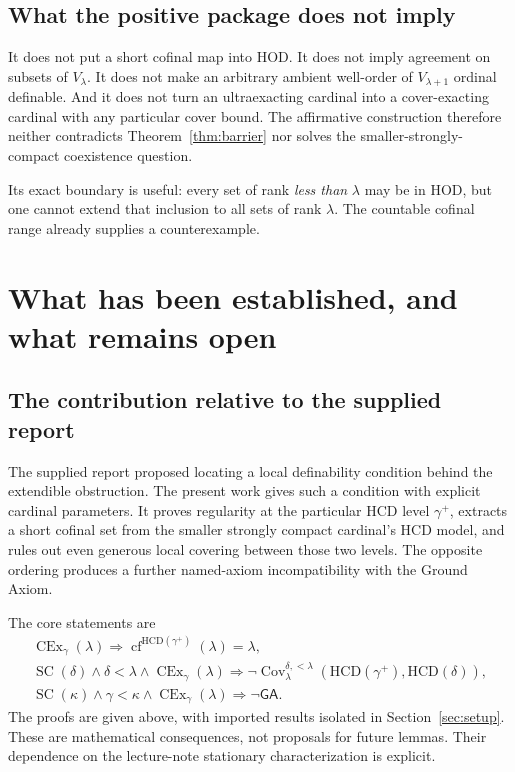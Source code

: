 \documentclass[11pt,letterpaper]{article}
\theoremstyle{definition}
\newcommand{\SC}{\operatorname{SC}}
\newcommand{\CEx}{\operatorname{CEx}}
\newcommand{\cf}{\operatorname{cf}}
\newcommand{\HCD}{\mathrm{HCD}}
\newcommand{\GA}{\mathsf{GA}}
\newcommand{\Cov}{\operatorname{Cov}}
\begin{document}
\subsection{What the positive package does not imply}

It does not put a short cofinal map into HOD. It does not imply agreement on
subsets of $V_\lambda$. It does not make an arbitrary ambient well-order of
$V_{\lambda+1}$ ordinal definable. And it does not turn an ultraexacting
cardinal into a cover-exacting cardinal with any particular cover bound.
The affirmative construction therefore neither contradicts
Theorem~\ref{thm:barrier} nor solves the smaller-strongly-compact coexistence
question.

Its exact boundary is useful: every set of rank \emph{less than} $\lambda$
may be in HOD, but one cannot extend that inclusion to all sets of rank
$\lambda$. The countable cofinal range already supplies a counterexample.

\section{What has been established, and what remains open}\label{sec:status}

\subsection{The contribution relative to the supplied report}

The supplied report proposed locating a local definability condition behind
the extendible obstruction. The present work gives such a condition with
explicit cardinal parameters. It proves regularity at the particular HCD
level $\gamma^+$, extracts a short cofinal set from the smaller strongly compact
cardinal's HCD model, and rules out even generous local covering between those
two levels. The opposite ordering produces a further named-axiom
incompatibility with the Ground Axiom.

The core statements are
\[
 \begin{gathered}
 \CEx_\gamma(\lambda)\Rightarrow
       \cf^{\HCD(\gamma^+)}(\lambda)=\lambda,\\
 \SC(\delta)\wedge\delta<\lambda\wedge\CEx_\gamma(\lambda)
       \Rightarrow\neg\Cov_\lambda^{\delta,<\lambda}
        (\HCD(\gamma^+),\HCD(\delta)),\\
 \SC(\kappa)\wedge\gamma<\kappa\wedge\CEx_\gamma(\lambda)
       \Rightarrow\neg\GA.
 \end{gathered}
\]
The proofs are given above, with imported results isolated in
Section~\ref{sec:setup}. These are mathematical consequences, not proposals
for future lemmas. Their dependence on the lecture-note stationary
characterization is explicit.
\end{document}
